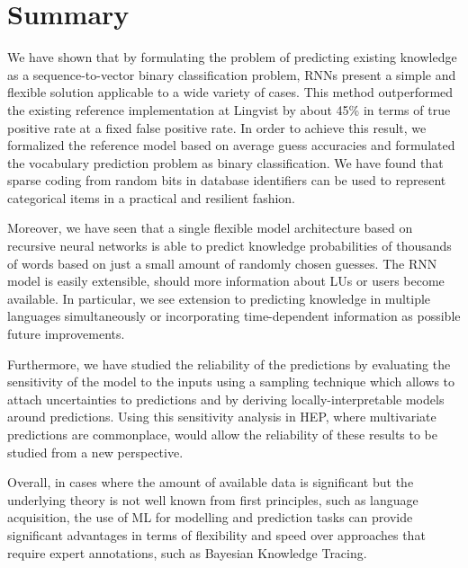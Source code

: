 \section{Summary}
\label{sec:lingvist_summary}
We have shown that by formulating the problem of predicting existing knowledge as a sequence-to-vector binary classification problem, RNNs present a simple and flexible solution applicable to a wide variety of cases. This method outperformed the existing reference implementation at Lingvist by about 45\% in terms of true positive rate at a fixed false positive rate. In order to achieve this result, we formalized the reference model based on average guess accuracies and formulated the vocabulary prediction problem as binary classification. We have found that sparse coding from random bits in database identifiers can be used to represent categorical items in a practical and resilient fashion.

Moreover, we have seen that a single flexible model architecture based on recursive neural networks is able to predict knowledge probabilities of thousands of words based on just a small amount of randomly chosen guesses. The RNN model is easily extensible, should more information about LUs or users become available. In particular, we see extension to predicting knowledge in multiple languages simultaneously or incorporating time-dependent information as possible future improvements.

Furthermore, we have studied the reliability of the predictions by evaluating the sensitivity of the model to the inputs using a sampling technique which allows to attach uncertainties to predictions and by deriving locally-interpretable models around predictions. Using this sensitivity analysis in HEP, where multivariate predictions are commonplace, would allow the reliability of these results to be studied from a new perspective.

Overall, in cases where the amount of available data is significant but the underlying theory is not well known from first principles, such as language acquisition, the use of ML for modelling and prediction tasks can provide significant advantages in terms of flexibility and speed over approaches that require expert annotations, such as Bayesian Knowledge Tracing.